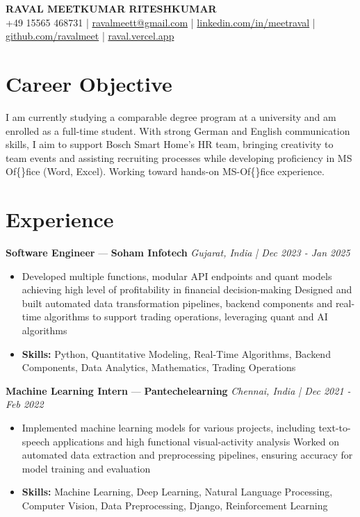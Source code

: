 \documentclass[a4paper,10pt]{article}
\begin{document}
\begin{center}
  {\Large\bfseries RAVAL MEETKUMAR RITESHKUMAR}\\[2pt]
  {\small +49 15565 468731 \;|\; \href{mailto:ravalmeett@gmail.com}{ravalmeett@gmail.com} \;|\; \href{https://www.linkedin.com/in/meetraval/}{linkedin.com/in/meetraval} \;|\; \href{https://github.com/ravalmeet}{github.com/ravalmeet} \;|\; \href{https://raval.vercel.app/}{raval.vercel.app}}
\end{center}
\vspace{-3pt}

\section*{Career Objective}
I am currently studying a comparable degree program at a university and am enrolled as a full-time student. With strong German and English communication skills, I aim to support Bosch Smart Home's HR team, bringing creativity to team events and assisting recruiting processes while developing proficiency in MS Of\{\}fice (Word, Excel). Working toward hands-on MS-Of\{\}fice experience.\par

\section*{Experience}
\textbf{Software Engineer} — \textbf{Soham Infotech} \hfill \textit{Gujarat, India \;|\; Dec 2023 - Jan 2025}\par
\vspace{1pt}
\begin{itemize}
  \item Developed multiple functions, modular API endpoints and quant models achieving high level of profitability in financial decision-making Designed and built automated data transformation pipelines, backend components and real-time algorithms to support trading operations, leveraging quant and AI algorithms
  \item \textbf{Skills:} Python, Quantitative Modeling, Real-Time Algorithms, Backend Components, Data Analytics, Mathematics, Trading Operations
\end{itemize}
\vspace{3pt}
\textbf{Machine Learning Intern} — \textbf{Pantechelearning} \hfill \textit{Chennai, India \;|\; Dec 2021 - Feb 2022}\par
\vspace{1pt}
\begin{itemize}
  \item Implemented machine learning models for various projects, including text-to-speech applications and high functional visual-activity analysis Worked on automated data extraction and preprocessing pipelines, ensuring accuracy for model training and evaluation
  \item \textbf{Skills:} Machine Learning, Deep Learning, Natural Language Processing, Computer Vision, Data Preprocessing, Django, Reinforcement Learning
\end{itemize}
\end{document}
